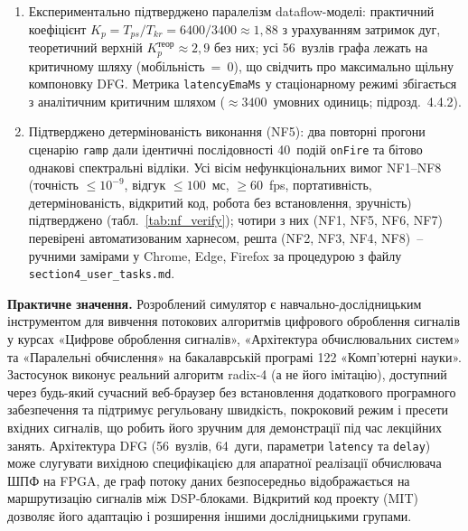 \documentclass[
]{article}
\begin{document}
\begin{enumerate}
  (табл.~\ref{tab:scenarios}): функція
  \texttt{compareWithFFT}\texttt{()} не виявила жодного розбіжного
  спектрального відліку; максимальна абсолютна похибка дорівнює нулю
  (бітовий збіг з еталоном \texttt{fft.js}) у всіх 6~сценаріях, що з
  великим запасом задовольняє поріг \(\varepsilon = 10^{- 9}\) (NF1).
  Підтверджено ермітову симетрію \(X(N - k) = X^{*}(k)\) для дійсних
  вхідних послідовностей (підрозд.~4.3).
\item
  Експериментально підтверджено паралелізм dataflow-моделі: практичний
  коефіцієнт \(K_{p} = T_{ps}/T_{kr} = 6400/3400 \approx 1{,}88\) з
  урахуванням затримок дуг, теоретичний верхній
  \(K_{p}^{\text{теор}} \approx 2{,}9\) без них; усі 56~вузлів графа
  лежать на критичному шляху (мобільність~=~0), що свідчить про
  максимально щільну компоновку DFG. Метрика \texttt{latencyEmaMs} у
  стаціонарному режимі збігається з аналітичним критичним шляхом
  (\(\approx 3400\)~умовних одиниць; підрозд.~4.4.2).
\item
  Підтверджено детермінованість виконання (NF5): два повторні прогони
  сценарію \texttt{ramp} дали ідентичні послідовності 40~подій
  \texttt{onFire} та бітово однакові спектральні відліки. Усі вісім
  нефункціональних вимог NF1--NF8 (точність \(\leq 10^{- 9}\), відгук
  \(\leq 100\)~мс, \(\geq 60\)~fps, портативність, детермінованість,
  відкритий код, робота без встановлення, зручність) підтверджено
  (табл.~\ref{tab:nf_verify}); чотири з них (NF1, NF5, NF6, NF7)
  перевірені автоматизованим харнесом, решта (NF2, NF3, NF4, NF8)~--
  ручними замірами у Chrome, Edge, Firefox за процедурою з файлу
  \texttt{section4\_user\_tasks.md}.
\end{enumerate}

\textbf{Практичне значення.} Розроблений симулятор є
навчально-дослідницьким інструментом для вивчення потокових алгоритмів
цифрового оброблення сигналів у курсах «Цифрове оброблення сигналів»,
«Архітектура обчислювальних систем» та «Паралельні обчислення» на
бакалаврській програмі 122 «Комп'ютерні науки». Застосунок виконує
реальний алгоритм radix-4 (а не його імітацію), доступний через
будь-який сучасний веб-браузер без встановлення додаткового програмного
забезпечення та підтримує регульовану швидкість, покроковий режим і
пресети вхідних сигналів, що робить його зручним для демонстрації під
час лекційних занять. Архітектура DFG (56~вузлів, 64~дуги, параметри
\texttt{latency} та \texttt{delay}) може слугувати вихідною
специфікацією для апаратної реалізації обчислювача ШПФ на FPGA, де граф
потоку даних безпосередньо відображається на маршрутизацію сигналів між
DSP-блоками. Відкритий код проекту (MIT) дозволяє його адаптацію і
розширення іншими дослідницькими групами.
\end{document}
